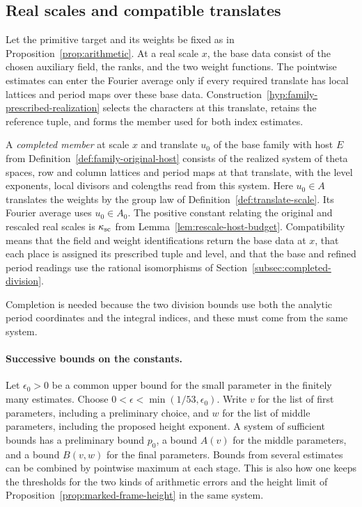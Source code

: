 \subsection{Real scales and compatible translates}
\label{subsec:window-points}

Let the primitive target and its weights be fixed as in
Proposition~\ref{prop:arithmetic}. At a real scale \(x\), the
base data consist of the chosen auxiliary field, the ranks,
and the two weight functions. The pointwise estimates can enter the Fourier average only if every required translate has local lattices and period maps over these base data. Construction~\ref{hyp:family-prescribed-realization} selects the characters at this translate, retains the reference tuple, and forms the member used for both index estimates.

\begin{definition}\label{def:completed-member}
A \emph{completed member} at scale \(x\) and translate \(u_0\)
of the base family with host \(E\) from Definition~\ref{def:family-original-host} consists of the realized system of theta spaces, row and
column lattices and period maps at that translate, with the
level exponents, local divisors and colengths read from this
system. Here \(u_0\in A\) translates the weights by the group law of
Definition~\ref{def:translate-scale}. Its Fourier average uses
\(u_0\in A_0\). The positive constant relating the original and rescaled real scales is \(\kappa_{\rm sc}\) from Lemma~\ref{lem:rescale-host-budget}. Compatibility means that the field and weight
identifications return the base data at \(x\), that each
place is assigned its prescribed tuple and level, and that
the base and refined period readings use the rational
isomorphisms of Section~\ref{subsec:completed-division}.
\end{definition}
Completion is needed because the two division bounds
use both the analytic period coordinates and the integral
indices, and these must come from the same system.

\paragraph{Successive bounds on the constants.}\label{par:window-successive-bounds}
Let \(\epsilon_0>0\) be a common upper bound for the small
parameter in the finitely many estimates. Choose
\(0<\epsilon<\min(1/53,\epsilon_0)\). Write \(v\) for the
list of first parameters, including a preliminary choice,
and \(w\) for the list of middle parameters, including the
proposed height exponent. A system of sufficient bounds has
a preliminary bound \(p_0\), a bound \(A(v)\) for the middle
parameters, and a bound \(B(v,w)\) for the final parameters.
Bounds from several estimates can be combined by
pointwise maximum at each stage. This is also how one keeps
the thresholds for the two kinds of arithmetic errors and the
height limit of Proposition~\ref{prop:marked-frame-height} in the
same system.

